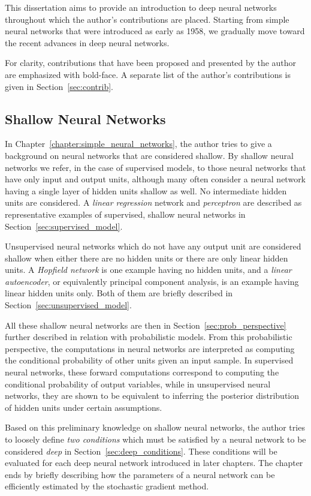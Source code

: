\documentclass[dissertation,nocontribution,draft*]{aaltoseries}
\begin{document}
This dissertation aims to provide an introduction to deep
neural networks throughout which the author's contributions
are placed. Starting from simple neural networks that were
introduced as early as 1958, we gradually move toward the
recent advances in deep neural networks. 

For clarity, contributions that have been proposed and presented by
the author are emphasized with bold-face. A separate list of
the author's contributions is given in
Section~\ref{sec:contrib}.

\subsection{Shallow Neural Networks}

In Chapter~\ref{chapter:simple_neural_networks}, the author
tries to give a background on neural networks that are
considered shallow. By shallow neural networks we refer, in
the case of supervised models, to those neural networks that
have only input and output units, although many often
consider a neural network having a single layer of hidden
units shallow as well. No intermediate hidden units are
considered. A \textit{linear regression} network and
\textit{perceptron} are described as representative examples
of supervised, shallow neural networks in
Section~\ref{sec:supervised_model}.

Unsupervised neural networks which do not have any output
unit are considered shallow when either there are no hidden
units or there are only linear hidden units. A
\textit{Hopfield network} is one example having no hidden
units, and a \textit{linear autoencoder}, or equivalently
principal component analysis, is an example having linear
hidden units only. Both of them are briefly described in
Section~\ref{sec:unsupervised_model}.

All these shallow neural networks are then in
Section~\ref{sec:prob_perspective} further described in
relation with probabilistic models. From this probabilistic
perspective, the computations in neural networks are
interpreted as computing the conditional probability of other
units given an input sample. In supervised neural networks,
these forward computations correspond to computing the
conditional probability of output variables, while in
unsupervised neural networks, they are shown to be
equivalent to inferring the posterior distribution of hidden
units under certain assumptions.

Based on this preliminary knowledge on shallow neural
networks, the author tries to loosely define \textit{two
conditions} which must be satisfied by a neural network to
be considered \textit{deep} in
Section~\ref{sec:deep_conditions}. These conditions will be
evaluated for each deep neural network introduced in later
chapters. The chapter ends by briefly describing how the
parameters of a neural network can be efficiently estimated
by the stochastic gradient method.
\end{document}
